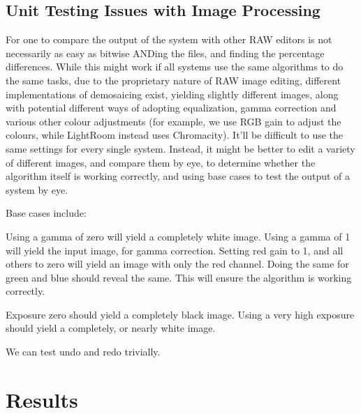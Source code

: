 \documentclass[11pt,a4paper]{article}
\begin{document}
\subsection{Unit Testing Issues with Image Processing}

For one to compare the output of the system with other RAW editors is not necessarily as easy as bitwise ANDing the files, and finding the percentage
differences. While this might work if all systems use the same algorithms to do the same tasks, due to the proprietary nature of RAW image editing,
different implementations of demosaicing exist, yielding slightly different images, along with potential different ways of adopting equalization,
gamma correction and various other colour adjustments (for example, we use RGB gain to adjust the colours, while LightRoom instead uses Chromacity).
It'll be difficult to use the same settings for every single system. Instead, it might be better to edit a variety of different images, and compare them
by eye, to determine whether the algorithm itself is working correctly, and using base cases to test the output of a system by eye.

Base cases include:

Using a gamma of zero will yield a completely white image. Using a gamma of 1 will yield the input image, for gamma correction.
Setting red gain to 1, and all others to zero will yield an image with only the red channel. Doing the same for green and blue should reveal the same.
This will ensure the algorithm is working correctly.

Exposure zero should yield a completely black image. Using a very high exposure should yield a completely, or nearly white image.

We can test undo and redo trivially.
\section{Results}

\end{document}
